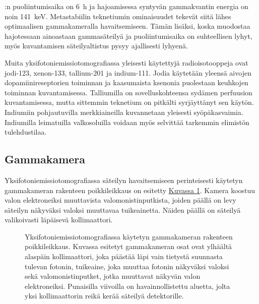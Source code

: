 :n puoliintumisaika on \qty{6}{\hour} ja hajoamisessa syntyvän gammakvantin energia on noin \qty{141}{\kilo\electronvolt}.\cite{cherry_interaction_2012, cherry_single_2012, crisan_radiopharmaceuticals_2022, van_audenhaege_review_2015} Metastabiilin teknetiumin ominaisuudet tekevät siitä lähes optimaalisen gammakameralla havaitsemiseen. Tämän lisäksi, koska  muodostaa hajotessaan ainoastaan gammasäteilyä ja puoliintumisaika on suhteellisen lyhyt, myös kuvantamisen säteilyaltistus pysyy ajallisesti lyhyenä.\cite{cherry_modes_2012, crisan_radiopharmaceuticals_2022}

Muita yksifotoniemissiotomografiassa yleisesti käytettyjä radioisotooppeja ovat jodi-123, xenon-133, tallium-201 ja indium-111. Jodia käytetään yleensä aivojen dopamiinireseptorien toiminnan ja kaasumaista ksenonia puolestaan keuhkojen toiminnan kuvantamisessa. Talliumilla on sovelluskohteensa sydämen perfuusion kuvantamisessa, mutta sittemmin teknetium on pitkälti syrjäyttänyt sen käytön. Indiumiin pohjautuvilla merkkiaineilla kuvannetaan yleisesti syöpäkasvaimia. Indiumilla leimatuilla valkosoluilla voidaan myös selvittää tarkemmin elimistön tulehdustilaa.\cite{crisan_radiopharmaceuticals_2022}

\subsection{Gammakamera}
Yksifotoniemissiotomografiassa säteilyn havaitsemiseen perinteisesti käytetyn gammakameran rakenteen poikkileikkaus on esitetty \hyperref[fig:spect-detektori]{Kuvassa \ref*{fig:spect-detektori}}. Kamera koostuu valon elektroneiksi muuttavista valomonistinputkista, joiden päällä on levy säteilyn näkyväksi valoksi muuttavaa tuikeainetta. Näiden päällä on säteilyä valikoivasti läpäisevä kollimaattori.\cite{van_audenhaege_review_2015, cherry_gamma_2012}

\begin{figure}[H]
    \centering
    \captionsetup{width=.9\textwidth}
    
    \caption{Yksifotoniemissiotomografiassa käytetyn gammakameran rakenteen poikkileikkaus. Kuvassa esitetyt gammakameran osat ovat ylhäältä alaspäin kollimaattori, joka päästää läpi vain tietystä suunnasta tulevan fotonin, tuikeaine, joka muuttaa fotonin näkyväksi valoksi sekä valomonistinputket, jotka muuttavat näkyvän valon elektroneiksi. Punaisilla viivoilla on havainnollistettu aluetta, jolta yksi kollimaattorin reikä kerää säteilyä detektorille.}
    \label{fig:spect-detektori}
\end{figure}

